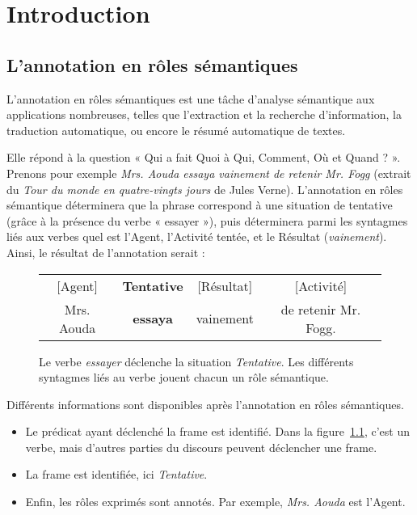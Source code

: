 \chapter{Introduction}
\label{ch:intro}

\section{L'annotation en rôles sémantiques}

L'annotation en rôles sémantiques est une tâche d'analyse sémantique aux
applications nombreuses, telles que l'extraction et la recherche d'information,
la traduction automatique, ou encore le résumé automatique de textes.

Elle répond à la question « Qui a fait Quoi à Qui, Comment, Où et Quand ? ».
Prenons pour exemple \emph{Mrs. Aouda essaya vainement de retenir Mr. Fogg}
(extrait du \emph{Tour du monde en quatre-vingts jours} de Jules Verne).
L'annotation en rôles sémantique déterminera que la phrase correspond à une
situation de tentative (grâce à la présence du verbe « essayer »), puis
déterminera parmi les syntagmes liés aux verbes quel est l'Agent, l'Activité
tentée, et le Résultat (\emph{vainement}). Ainsi, le résultat de l'annotation
serait :

\begin{figure}[htbl]
    \centering
    \begin{tabular}{cccc}
      [Agent]  & \textbf{Tentative} & [Résultat]  & [Activité]           \tabularnewline
    Mrs. Aouda & \textbf{essaya}  & vainement  & de retenir Mr. Fogg. \tabularnewline
    \end{tabular}
    \caption{\label{fig:introsrl}Le verbe \emph{essayer} déclenche la situation \emph{Tentative}.
    Les différents syntagmes liés au verbe jouent chacun un rôle sémantique.}
\end{figure}


Différents informations sont disponibles après l'annotation en rôles sémantiques.

\begin{itemize}
    \item Le prédicat ayant déclenché la frame est identifié. Dans la
        figure~\ref{fig:introsrl}, c'est un verbe, mais d'autres parties du
        discours peuvent déclencher une frame.
    \item La frame est identifiée, ici \emph{Tentative}.
    \item Enfin, les rôles exprimés sont annotés. Par exemple, \emph{Mrs.
        Aouda} est l'Agent.
\end{itemize}

